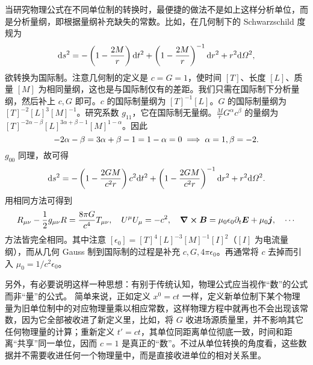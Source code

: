 当研究物理公式在不同单位制的转换时，最便捷的做法不是如上这样分析单位，而是分析量纲，即根据量纲补充缺失的常数。比如，在几何制下的 Schwarzschild 度规为
\[
    \dd s^2=-\left(1-\frac{2M}{r}\right)\dd t^2+\left(1-\frac{2M}{r}\right)^{-1}\dd r^2+r^2\dd\Omega^2,
\]
欲转换为国际制。注意几何制的定义是 $c=G=1$，使时间 $[T]$、长度 $[L]$、质量 $[M]$ 为相同量纲，这也是与国际制仅有的差距。我们只需在国际制下分析量纲，然后补上 $c,G$ 即可。$c$ 的国际制量纲为 $[T]^{-1}[L]$。$G$ 的国际制量纲为 $[T]^{-2}[L]^3[M]^{-1}$。研究系数 $g_{11}$，它在国际制无量纲。$\frac{M}{r}G^{\alpha}c^{\beta}$ 的量纲为 $[T]^{-2\alpha-\beta}[L]^{3\alpha+\beta-1}[M]^{1-\alpha}$。因此
\[
    -2\alpha-\beta=3\alpha+\beta-1=1-\alpha=0\implies \alpha=1,\beta=-2.
\]
$g_{00}$ 同理，故可得
\[
    \dd s^2=-\left(1-\frac{2GM}{c^2 r}\right)c^2\dd t^2+\left(1-\frac{2GM}{c^2 r}\right)^{-1}\dd r^2+r^2\dd\Omega^2.
\]
用相同方法可得到
\[
    R_{\mu\nu}-\frac 12 g_{\mu\nu} R=\frac{8\pi G}{c^4} T_{\mu\nu},\quad U^\mu U_\mu = - c^2,\quad \curl\vb* B=\mu_0\epsilon_0\partial_t\vb* E+\mu_0\vb* j, \quad \cdots
\]
方法皆完全相同。其中注意 $[\epsilon_0]=[T]^4[L]^{-3}[M]^{-1}[I]^2$（$[I]$ 为电流量纲），而从几何 Gauss 制到国际制的过程是补充 $c,G,4\pi\epsilon_0$。再通常将 $c$ 去掉而引入 $\mu_0=1/c^2\epsilon_0$。

另外，有必要说明这样一种思想：有别于传统认知，物理公式应当视作“数”的公式而非“量”的公式。
简单来说，正如定义 $x^0=ct$ 一样，定义新单位制下某个物理量为旧单位制中的对应物理量乘以相应常数，这样物理方程中就再也不会出现该常数，因为它全部被收进了新定义里，比如，将 $G$ 收进场源质量里，并不影响其它任何物理量的计算；重新定义 $t'=ct$，其单位同距离单位彻底一致，时间和距离“共享”同一单位，因而 $c=1$ 是真正的“数”。不过从单位转换的角度看，这些数据并不需要收进任何一个物理量中，而是直接收进单位的相对关系里。